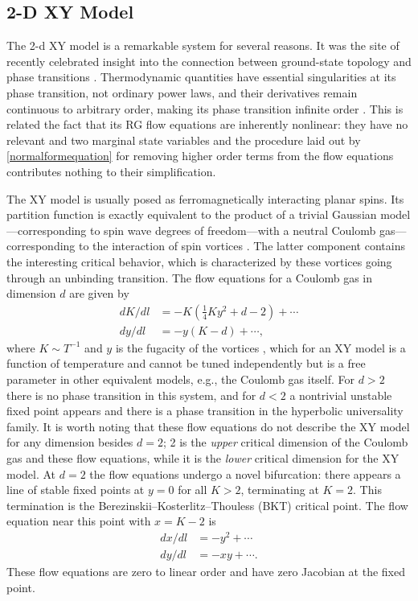 \documentclass[
 reprint,
 amsmath,amssymb,
 aps, superscriptaddress, pre
]{revtex4-1}
\begin{document}
\subsection{2-D XY Model}

The 2-d XY model is a remarkable system for several reasons. It was the site
of recently celebrated insight into the connection between ground-state
topology and phase transitions \cite{kosterlitz2017nobel}. Thermodynamic
quantities have essential singularities at its phase transition, not ordinary
power laws, and their derivatives remain continuous to arbitrary order, making
its phase transition infinite order \cite{berezinskii1970destroying,
kosterlitz1973ordering, kosterlitz1974critical}.  This is related the fact
that its RG flow equations are inherently nonlinear: they have no relevant and
two marginal state variables and the procedure laid out by
\eqref{normalformequation} for removing higher order terms from the flow
equations contributes nothing to their simplification.

The XY model is usually posed as ferromagnetically interacting planar spins.
Its partition function is exactly equivalent to the product of a trivial
Gaussian model---corresponding to spin wave degrees of freedom---with a
neutral Coulomb gas---corresponding to the interaction of spin vortices
\cite{knops1977exact}. The latter component contains the interesting critical
behavior, which is characterized by these vortices going through an unbinding
transition. The flow equations for a Coulomb gas in dimension $d$ are given by
\begin{align}
  dK/dl&=-K(\tfrac14Ky^2+d - 2)+\cdots\\
  dy/dl&=-y(K-d)+\cdots,
\end{align}
where $K\sim T^{-1}$ and $y$ is the fugacity of the vortices
\cite{kosterlitz1977d}, which for an XY model is a function of temperature and
cannot be tuned independently but is a free parameter in other equivalent
models, e.g., the Coulomb gas itself. For $d>2$ there is no phase transition
in this system, and for $d<2$ a nontrivial unstable fixed point appears and
there is a phase transition in the hyperbolic universality family. It is worth
noting that these flow equations do not describe the XY model for any
dimension besides $d=2$; 2 is the \emph{upper} critical dimension of the
Coulomb gas and these flow equations, while it is the \emph{lower} critical
dimension for the XY model. At $d=2$ the flow equations undergo a novel
bifurcation: there appears a line of stable fixed points at $y=0$ for all
$K>2$, terminating at $K=2$. This termination is the
Berezinskii--Kosterlitz--Thouless (BKT) critical point. The flow equation near this point with $x=K-2$ is
\begin{align}
  \label{eq:kt-truncated:1}
  dx/dl&=-y^2+\cdots\\
  \label{eq:kt-truncated:2}
  dy/dl&=-xy+\cdots.
\end{align}
These flow equations are zero to linear order and have zero Jacobian at the fixed point.
\end{document}
